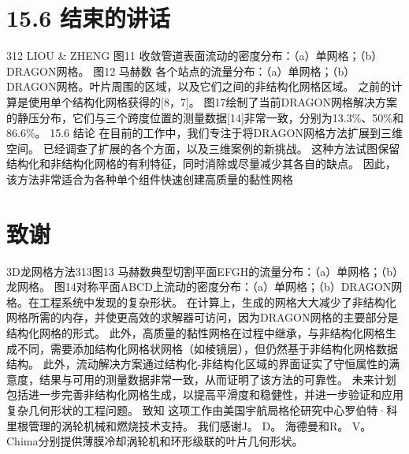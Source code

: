 \documentclass[UTF8,11pt,a4paper,openany,fontset=fandol]{ctexbook}
\begin{document}
\section{15.6 结束的讲话}
312 LIOU \& ZHENG 图11 收敛管道表面流动的密度分布：（a）单网格；（b）DRAGON网格。 图12 马赫数 各个站点的流量分布：（a）单网格；（b）DRAGON网格。叶片周围的区域，以及它们之间的非结构化网格区域。 之前的计算是使用单个结构化网格获得的[8，7]。 图17绘制了当前DRAGON网格解决方案的静压分布，它们与三个跨度位置的测量数据[14]非常一致，分别为13.3\%、50\%和86.6\%。 15.6 结论 在目前的工作中，我们专注于将DRAGON网格方法扩展到三维空间。 已经调查了扩展的各个方面，以及三维案例的新挑战。 这种方法试图保留结构化和非结构化网格的有利特征，同时消除或尽量减少其各自的缺点。 因此，该方法非常适合为各种单个组件快速创建高质量的黏性网格

\section{致谢}
3D龙网格方法313图13 马赫数典型切割平面EFGH的流量分布：（a）单网格；（b）龙网格。 图14对称平面ABCD上流动的密度分布：（a）单网格；（b）DRAGON网格。在工程系统中发现的复杂形状。 在计算上，生成的网格大大减少了非结构化网格所需的内存，并使更高效的求解器可访问，因为DRAGON网格的主要部分是结构化网格的形式。 此外，高质量的黏性网格在过程中继承，与非结构化网格生成不同，需要添加结构化网格状网格（如棱镜层），但仍然基于非结构化网格数据结构。 此外，流动解决方案通过结构化-非结构化区域的界面证实了守恒属性的满意度，结果与可用的测量数据非常一致，从而证明了该方法的可靠性。 未来计划包括进一步完善非结构化网格生成，以提高平滑度和稳健性，并进一步验证和应用复杂几何形状的工程问题。 致知 这项工作由美国宇航局格伦研究中心罗伯特·科里根管理的涡轮机械和燃烧技术支持。 我们感谢J。 D。 海德曼和R。 V。 Chima分别提供薄膜冷却涡轮机和环形级联的叶片几何形状。
\end{document}

